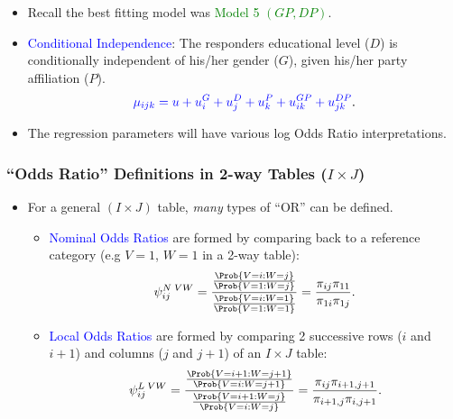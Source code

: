 \documentclass[oneside]{book}\usepackage[]{graphicx}\usepackage[svgnames]{xcolor}
\providecommand\given{} %
\renewcommand\given{\nonscript\:\delimsize\vert\nonscript\:\mathopen{}}%
\renewcommand\given{\nonscript\:\delimsize\vert\nonscript\:\mathopen{}}%
\renewcommand\given{\nonscript\:\delimsize\vert\nonscript\:\mathopen{}}%
\renewcommand\given{\nonscript\:\delimsize\vert\nonscript\:\mathopen{}}%
\renewcommand\given{\nonscript\:\delimsize\vert\nonscript\:\mathopen{}}%
\renewcommand\given{\nonscript\:\delimsize\vert\nonscript\:\mathopen{}}%
\renewcommand\given{\nonscript\:\delimsize\vert\nonscript\:\mathopen{}}%
\renewcommand\given{\nonscript\:\delimsize\vert\nonscript\:\mathopen{}}%
\renewcommand\given{\nonscript\:\delimsize\vert\nonscript\:\mathopen{}}%
\renewcommand\given{\nonscript\:\delimsize\vert\nonscript\:\mathopen{}}%
\renewcommand\given{\nonscript\:\delimsize\vert\nonscript\:\mathopen{}}%
\renewcommand\given{\nonscript\:\delimsize\vert\nonscript\:\mathopen{}}%
\let\log\relax%
\renewcommand\given{:}
\begin{document}
\begin{itemize}
    \item Recall the best fitting model was \textcolor{Green}{Model 5 $ (GP,DP) $}.
    \item \textcolor{Blue}{Conditional Independence}: The responders educational level ($D$) is conditionally
          independent of his/her gender ($G$), given his/her party affiliation ($P$).
          \[ \textcolor{Blue}{\log{\mu_{ijk}}=u+u_i^G+u_j^D+u_k^P+u_{ik}^{GP}+u_{jk}^{DP}}. \]
    \item The regression parameters will have various log Odds Ratio interpretations.
\end{itemize}
\subsubsection*{``Odds Ratio'' Definitions in 2-way Tables ($I \times J$)}
\begin{itemize}
    \item For a general $ (I\times J) $ table, \emph{many} types of ``OR'' can be defined.
          \begin{itemize}
              \item \textcolor{Blue}{Nominal Odds Ratios} are formed by comparing back to a reference category (e.g
                    $V = 1$, $W = 1$ in a 2-way table):
                    \[ \psi_{ij}^{N\;VW}
                        =\frac{\frac{\Prob{V=i\given W=j}}{\Prob{V=1\given W=j}}}{\frac{\Prob{V=i\given W=1}}{\Prob{V=1\given W=1}}}
                        =\frac{\pi_{ij}\pi_{11}}{\pi_{1i}\pi_{1j}}. \]
              \item \textcolor{Blue}{Local Odds Ratios} are formed by comparing 2 successive rows ($ i $ and $ i+1 $) and columns
                    ($ j $ and $ j+1 $) of an $ I\times J $ table:
                    \[ \psi_{ij}^{L\;VW}
                        =\frac{\frac{\Prob{V=i+1\given W=j+1}}{\Prob{V=i\given W=j+1}}}{\frac{\Prob{V=i+1\given W=j}}{\Prob{V=i\given W=j}}}
                        =\frac{\pi_{ij}\pi_{i+1,j+1}}{\pi_{i+1,j}\pi_{i,j+1}}. \]
          \end{itemize}
\end{itemize}
\end{document}
